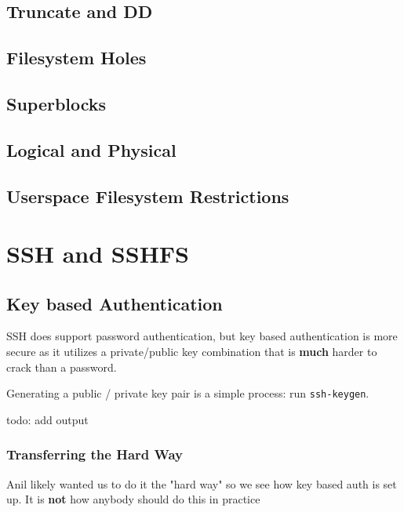 \subsection{Truncate and DD}


\subsection{Filesystem Holes}

\subsection{Superblocks}

\subsection{Logical and Physical}

\subsection{Userspace Filesystem Restrictions}

	 
\section {SSH and SSHFS}
\subsection{Key based Authentication}
SSH does support password authentication, but key based authentication is more secure as it utilizes a private/public key combination that is \textbf{much} harder to crack than a password.

Generating a public / private key pair is a simple process: run \texttt{ssh-keygen}.

todo: add output 

\subsubsection{Transferring the Hard Way}
Anil likely wanted us to do it the "hard way" so we see how key based auth is set up. It is \textbf{not} how anybody should do this in practice

